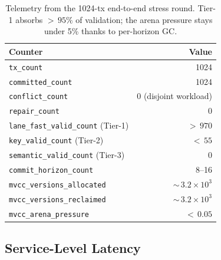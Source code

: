 \begin{table}[ht]
\centering
\begin{tabular}{@{}lr@{}}
\toprule
\textbf{Counter} & \textbf{Value} \\
\midrule
\texttt{tx\_count}                       & 1024 \\
\texttt{committed\_count}                & 1024 \\
\texttt{conflict\_count}                 & 0 (disjoint workload) \\
\texttt{repair\_count}                   & 0 \\
\texttt{lane\_fast\_valid\_count} (Tier-1) & ${>}\,970$ \\
\texttt{key\_valid\_count} (Tier-2)        & ${<}\,55$ \\
\texttt{semantic\_valid\_count} (Tier-3)   & 0 \\
\texttt{commit\_horizon\_count}            & 8--16 \\
\texttt{mvcc\_versions\_allocated}         & ${\sim}\,3.2{\times}10^3$ \\
\texttt{mvcc\_versions\_reclaimed}         & ${\sim}\,3.2{\times}10^3$ \\
\texttt{mvcc\_arena\_pressure}             & ${<}\,0.05$ \\
\bottomrule
\end{tabular}
\caption{Telemetry from the 1024-tx end-to-end stress round.
Tier-1 absorbs ${>}\,95\%$ of validation; the arena pressure stays
under 5\% thanks to per-horizon GC.}
\label{tab:stress-telemetry}
\end{table}

\subsection{Service-Level Latency}

